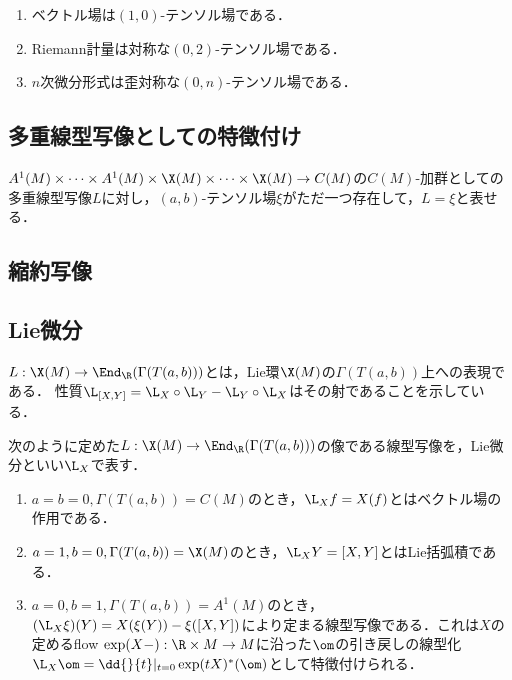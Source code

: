 \documentclass[uplatex,dvipdfmx]{jsreport}
\begin{document}
\begin{example}\mbox{}
    \begin{enumerate}
        \item ベクトル場は$(1,0)$-テンソル場である．
        \item Riemann計量は対称な$(0,2)$-テンソル場である．
        \item $n$次微分形式は歪対称な$(0,n)$-テンソル場である．
    \end{enumerate}
\end{example}

\subsection{多重線型写像としての特徴付け}

\begin{theorem}
    $A^1(M)\times\cdots\times A^1(M)\times\X(M)\times\cdots\times\X(M)\to C(M)$の$C(M)$-加群としての多重線型写像$L$に対し，$(a,b)$-テンソル場$\xi$がただ一つ存在して，$L=\xi$と表せる．
\end{theorem}

\subsection{縮約写像}

\subsection{Lie微分}

\begin{tcolorbox}[colframe=ForestGreen, colback=ForestGreen!10!white,breakable,colbacktitle=ForestGreen!40!white,coltitle=black,fonttitle=\bfseries\sffamily,
title=]
    $L:\X(M)\to\End_\R(\Gamma(T(a,b)))$とは，Lie環$\X(M)$の$\Gamma(T(a,b))$上への表現である．
    性質$\L_{[X,Y]}=\L_X\circ\L_Y-\L_Y\circ\L_X$はその射であることを示している．
\end{tcolorbox}

\begin{definition}
    次のように定めた$L:\X(M)\to\End_\R(\Gamma(T(a,b)))$の像である線型写像を，Lie微分といい$\L_X$で表す．
    \begin{enumerate}
        \item $a=b=0,\Gamma(T(a,b))=C(M)$のとき，$\L_Xf=X(f)$とはベクトル場の作用である．
        \item $a=1,b=0,\Gamma(T(a,b))=\X(M)$のとき，$\L_XY=[X,Y]$とはLie括弧積である．
        \item $a=0,b=1,\Gamma(T(a,b))=A^1(M)$のとき，$(\L_X\xi)(Y)=X(\xi(Y))-\xi([X,Y])$により定まる線型写像である．これは$X$の定めるflow $\exp(X-):\R\times M\to M$に沿った$\om$の引き戻しの線型化$\L_X\om=\dd{}{t}|_{t=0}\exp(tX)^*(\om)$として特徴付けられる．
    \end{enumerate}
\end{definition}
\end{document}

